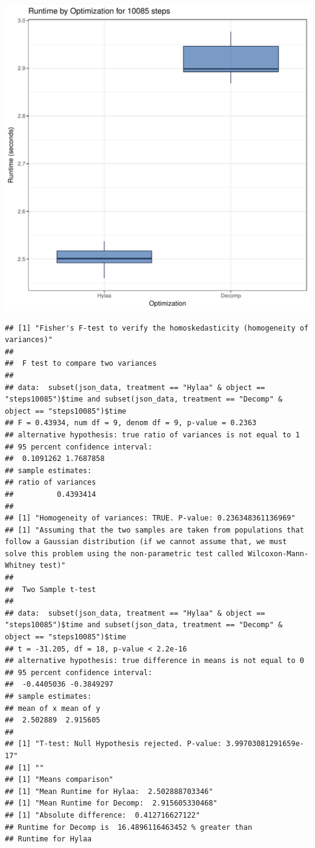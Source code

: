\documentclass{article}\usepackage[]{graphicx}\usepackage[]{color}
\makeatletter
\def\maxwidth{ %
  \ifdim\Gin@nat@width>\linewidth
    \linewidth
  \else
    \Gin@nat@width
  \fi
}
\newenvironment{kframe}{%
 \def\at@end@of@kframe{}%
 \ifinner\ifhmode%
  \def\at@end@of@kframe{\end{minipage}}%
  \begin{minipage}{\columnwidth}%
 \fi\fi%
 \def\FrameCommand##1{\hskip\@totalleftmargin \hskip-\fboxsep
 \colorbox{shadecolor}{##1}\hskip-\fboxsep
     \hskip-\linewidth \hskip-\@totalleftmargin \hskip\columnwidth}%
 \MakeFramed {\advance\hsize-\width
   \@totalleftmargin\z@ \linewidth\hsize
   \@setminipage}}%
 {\par\unskip\endMakeFramed%
 \at@end@of@kframe}
\newenvironment{knitrout}{}{} %
\makeatother
\begin{document}
\begin{knitrout}
\color{fgcolor}
\includegraphics[width=\maxwidth]{figure/RH2_steps10085-1} 
\begin{kframe}\begin{verbatim}
## [1] "Fisher's F-test to verify the homoskedasticity (homogeneity of variances)"
## 
## 	F test to compare two variances
## 
## data:  subset(json_data, treatment == "Hylaa" & object == "steps10085")$time and subset(json_data, treatment == "Decomp" & object == "steps10085")$time
## F = 0.43934, num df = 9, denom df = 9, p-value = 0.2363
## alternative hypothesis: true ratio of variances is not equal to 1
## 95 percent confidence interval:
##  0.1091262 1.7687858
## sample estimates:
## ratio of variances 
##          0.4393414 
## 
## [1] "Homogeneity of variances: TRUE. P-value: 0.236348361136969"
## [1] "Assuming that the two samples are taken from populations that follow a Gaussian distribution (if we cannot assume that, we must solve this problem using the non-parametric test called Wilcoxon-Mann-Whitney test)"
## 
## 	Two Sample t-test
## 
## data:  subset(json_data, treatment == "Hylaa" & object == "steps10085")$time and subset(json_data, treatment == "Decomp" & object == "steps10085")$time
## t = -31.205, df = 18, p-value < 2.2e-16
## alternative hypothesis: true difference in means is not equal to 0
## 95 percent confidence interval:
##  -0.4405036 -0.3849297
## sample estimates:
## mean of x mean of y 
##  2.502889  2.915605 
## 
## [1] "T-test: Null Hypothesis rejected. P-value: 3.99703081291659e-17"
## [1] ""
## [1] "Means comparison"
## [1] "Mean Runtime for Hylaa:  2.502888703346"
## [1] "Mean Runtime for Decomp:  2.915605330468"
## [1] "Absolute difference:  0.412716627122"
## Runtime for Decomp is  16.4896116463452 % greater than 
## Runtime for Hylaa
\end{verbatim}
\end{kframe}
\end{knitrout}
\end{document}
